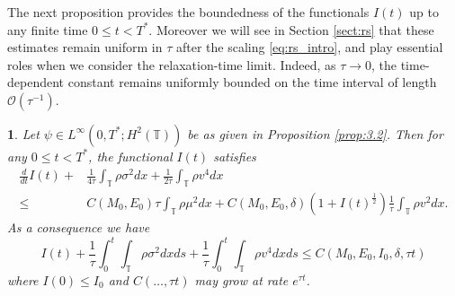 \documentclass[leqno]{amsart}
\theoremstyle{plain}
\theoremstyle{definition}
\theoremstyle{remark}
\theoremstyle{plain}
\theoremstyle{plain}
\newtheorem{prop}[thm]{\protect\propositionname}
\providecommand{\propositionname}{Proposition}
\def\T{{\mathbb T}}%
\numberwithin{equation}{section}
\begin{document}
The next proposition provides the boundedness of the functionals $I(t)$ up to any finite time $0\leq t<T^*$. Moreover we will see in Section \ref{sect:rs} that these estimates remain uniform in $\tau$ after the scaling \eqref{eq:rs_intro}, and play essential roles when we consider the relaxation-time limit. Indeed, as $\tau\to 0$, the time-dependent constant remains uniformly bounded on the time interval of length $\mathcal{O}(\tau^{-1})$.

\begin{prop}\label{prop:bdI}
Let $\psi\in L^\infty(0,T^*;H^2(\T))$ be as given in Proposition \ref{prop:3.2}. Then for any $0\leq t<T^*$, the functional $I(t)$ satisfies 
\begin{equation}\label{eq:ineqI}
\begin{aligned}
\frac{d}{dt} I(t)+&\frac{1}{4\tau}\int_\T\rho\sigma^2dx+\frac{1}{2\tau}\int_\T \rho v^4 dx \\
\leq & C(M_0,E_0)\tau \int_\T\rho\mu^2 dx+C(M_0,E_0,\delta)(1+I(t)^\frac12)\frac{1}{\tau}\int_\T \rho v^2dx.
\end{aligned}
\end{equation}
As a consequence we have
\begin{equation}\label{eq:bdI}
I(t)+\frac{1}{\tau}\int_0^t\int_\T \rho\sigma^2 dxds+\frac{1}{\tau}\int_0^t\int_\T \rho v^4 dxds\leq C(M_0,E_0,I_0,\delta,\tau t)
\end{equation}
where $I(0)\leq I_0$ and $C(\dots,\tau t)$ may grow at rate $e^{\tau t}$.
\end{prop}
\end{document}
